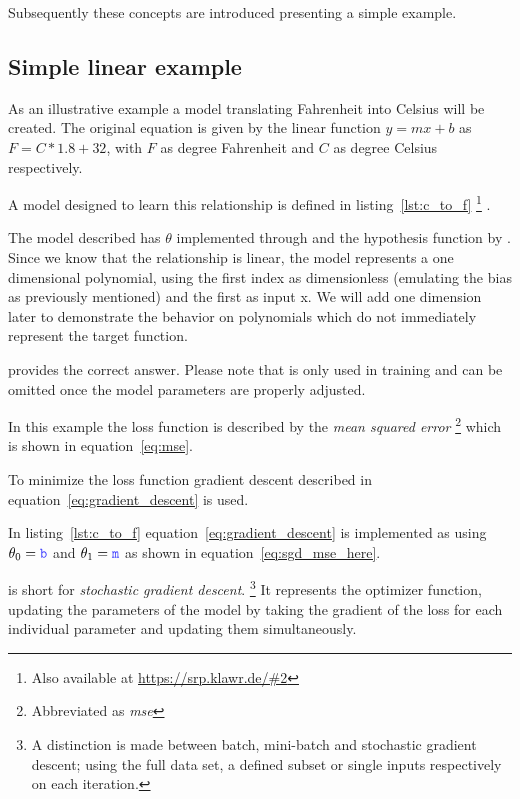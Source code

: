 Subsequently these concepts are introduced presenting a simple example.

\subsection{Simple linear example} \label{ch:simple_linear_example}

As an illustrative example a model translating Fahrenheit into Celsius will be created.
The original equation is given by the linear function $y = mx + b$ as $F = C * 1.8 + 32$, with $F$ as degree Fahrenheit and $C$ as degree Celsius respectively.

A model designed to learn this relationship is defined in listing~\ref{lst:c_to_f} \footnote{Also available at \url{https://srp.klawr.de/\#2}} .



The model described has $\theta$ implemented through  and the hypothesis function by .
Since we know that the relationship is linear, the model represents a one dimensional polynomial, using the first index as dimensionless (emulating the bias as previously mentioned) and the first as input x.
We will add one dimension later to demonstrate the behavior on polynomials which do not immediately represent the target function.

 provides the correct answer.
Please note that  is only used in training and can be omitted once the model parameters are properly adjusted.

In this example the loss function is described by the \textit{mean squared error } \footnote{ Abbreviated as \textit{mse} } which is shown in equation~\eqref{eq:mse}.

To minimize the loss function gradient descent described in equation~\eqref{eq:gradient_descent} is used.

In listing~\ref{lst:c_to_f} equation~\eqref{eq:gradient_descent} is implemented as  using $\theta_0 = \code{b}$ and $\theta_1= \code{m}$ as shown in equation~\eqref{eq:sgd_mse_here}.

 is short for \textit{stochastic gradient descent}.
\footnote{A distinction is made between batch, mini-batch and stochastic
    gradient descent;
    using the full data set, a defined subset or single inputs respectively on
    each iteration.}
It represents the optimizer function, updating the parameters of the model by taking the gradient of the loss for each individual parameter and updating them simultaneously.

